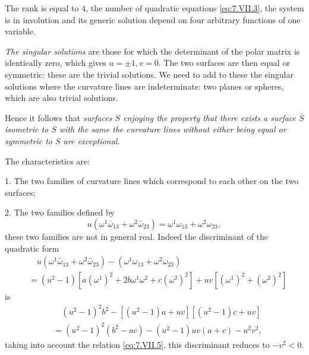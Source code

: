 \documentclass[leqno,11pt]{book}
\numberwithin{equation}{chapter}
\theoremstyle{shape1}
\theoremstyle{shape0}
\theoremstyle{shape2}
\theoremstyle{definition}
\begin{document}
The rank is equal to $4$, the number of quadratic equations \eqref{eq:7.VII.3}, the system is in involution and its generic solution depend on four arbitrary functions of one variable.



\vspace{12pt}\fsec \emph{The singular solutions} are those for which the determinant of the polar matrix is identically zero, which gives $u=\pm 1, v=0$. The two surfaces are then equal or symmetric: these are the trivial solutions. We need to add to these the singular solutions where the curvature lines are indeterminate: two planes or spheres, which are also trivial solutions.

Hence it follows that \emph{surfaces $S$ enjoying the property that there exists a surface $\bar S$ isometric to $S$ with the same the curvature lines without either being equal or symmetric to $S$ are exceptional.}

The characteristics are:

1. The two families of curvature lines which correspond to each other on the two surfaces;

2. The two families defined by
\[
u(\omega^{1}\bar\omega_{13}+\omega^{2}\bar\omega_{23})=\omega^{1}\omega_{13}+\omega^{2}\omega_{23},
\]
these two families are not in general real. Indeed the discriminant of the quadratic form
\begin{align*}
  &\quad u(\omega^{1}\bar\omega_{13}+\omega^{2}\bar\omega_{23})-(\omega^{1}\omega_{13}+\omega^{2}\omega_{23})\\
  &=(u^{2}-1)[a(\omega^{1})^{2}+2b\omega^{1}\omega^{2}+c(\omega^{2})^{2}]+uv[(\omega^{1})^{2}+(\omega^{2})^{2}]
\end{align*}
is
\begin{align*}
  &\quad (u^{2}-1)^{2}b^{2}-[(u^{2}-1)a+uv][(u^{2}-1)c+uv]\\
  &=(u^{2}-1)^{2}(b^{2}-ac)-(u^{2}-1)uv(a+c)-u^{2}v^{2},
\end{align*}
taking into account the relation  \eqref{eq:7.VII.5}, this discriminant reduces to $-v^{2}<0$.
\end{document}
